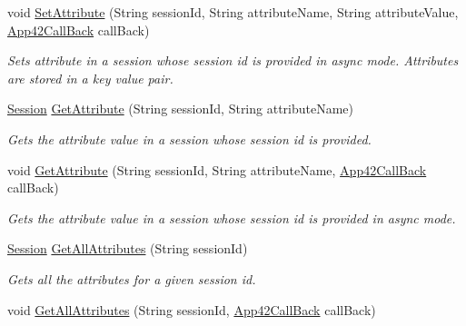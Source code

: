 \begin{DoxyCompactItemize}
void \hyperlink{classcom_1_1shephertz_1_1app42_1_1paas_1_1sdk_1_1csharp_1_1session_1_1_session_service_a76d8a2b2ad7b375df0b51234f773bd00}{Set\+Attribute} (String session\+Id, String attribute\+Name, String attribute\+Value, \hyperlink{interfacecom_1_1shephertz_1_1app42_1_1paas_1_1sdk_1_1csharp_1_1_app42_call_back}{App42\+Call\+Back} call\+Back)
\begin{DoxyCompactList}\small\item\em Sets attribute in a session whose session id is provided in async mode. Attributes are stored in a key value pair. \end{DoxyCompactList}\item 
\hyperlink{classcom_1_1shephertz_1_1app42_1_1paas_1_1sdk_1_1csharp_1_1session_1_1_session}{Session} \hyperlink{classcom_1_1shephertz_1_1app42_1_1paas_1_1sdk_1_1csharp_1_1session_1_1_session_service_ad77e095e617daed1d898f1735d2c3094}{Get\+Attribute} (String session\+Id, String attribute\+Name)
\begin{DoxyCompactList}\small\item\em Gets the attribute value in a session whose session id is provided. \end{DoxyCompactList}\item 
void \hyperlink{classcom_1_1shephertz_1_1app42_1_1paas_1_1sdk_1_1csharp_1_1session_1_1_session_service_a5adacdbdce6b4a4f14d86f1973d6555d}{Get\+Attribute} (String session\+Id, String attribute\+Name, \hyperlink{interfacecom_1_1shephertz_1_1app42_1_1paas_1_1sdk_1_1csharp_1_1_app42_call_back}{App42\+Call\+Back} call\+Back)
\begin{DoxyCompactList}\small\item\em Gets the attribute value in a session whose session id is provided in async mode. \end{DoxyCompactList}\item 
\hyperlink{classcom_1_1shephertz_1_1app42_1_1paas_1_1sdk_1_1csharp_1_1session_1_1_session}{Session} \hyperlink{classcom_1_1shephertz_1_1app42_1_1paas_1_1sdk_1_1csharp_1_1session_1_1_session_service_a5c891f516cd4454bf975847d05c938eb}{Get\+All\+Attributes} (String session\+Id)
\begin{DoxyCompactList}\small\item\em Gets all the attributes for a given session id. \end{DoxyCompactList}\item 
void \hyperlink{classcom_1_1shephertz_1_1app42_1_1paas_1_1sdk_1_1csharp_1_1session_1_1_session_service_a8d671ec89930d748d9d8cc0832150f1c}{Get\+All\+Attributes} (String session\+Id, \hyperlink{interfacecom_1_1shephertz_1_1app42_1_1paas_1_1sdk_1_1csharp_1_1_app42_call_back}{App42\+Call\+Back} call\+Back)

\end{DoxyCompactItemize}

